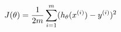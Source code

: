 \documentclass[preview]{standalone}
\begin{document}
\begin{align*}
\special{dvisvgm:raw <g id='unique000'>}J(\theta) = \frac{1}{2m}\sum_{i=1}^{m}(h_\theta(x^{(i)})-y^{(i)})^2\special{dvisvgm:raw </g>}
\end{align*}
\end{document}
